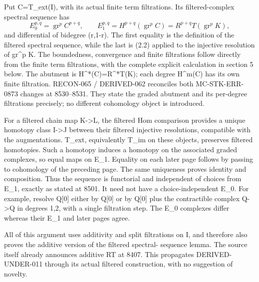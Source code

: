 \documentclass[11pt]{article}
\begin{document}
Put C\allowbreak{}=T\_\allowbreak{}ext(I)\allowbreak{},\allowbreak{} with its actual finite term filtrations. Its filtered-complex spectral sequence has \[
 E_0^{p,q}=\operatorname{gr}^p C^{p+q},\qquad
 E_1^{p,q}=H^{p+q}(\operatorname{gr}^p C)
          =R^{p+q}T(\operatorname{gr}^p K),                  \tag{4.2}
\] and differential of bidegree (r,\allowbreak{}1-r)\allowbreak{}. The first equality is the definition of the filtered spectral sequence,\allowbreak{} while the last is (2.2)\allowbreak{} applied to the injective resolution of gr\^{}p K. The boundedness,\allowbreak{} convergence and finite filtrations follow directly from the finite term filtrations,\allowbreak{} with the complete explicit calculation in section 5 below. The abutment is H\textasciicircum{}*(C)\allowbreak{}\allowbreak{}=R\textasciicircum{}*T(K)\allowbreak{}; each degree H\textasciicircum{}m(C)\allowbreak{} has its own finite filtration. RECON-065 /\allowbreak{} DERIVED-062 reconciles both MC-STK-ERR-0873 changes at 8530–\allowbreak{}8531. They state the graded abutment and its per-degree filtrations precisely; no different cohomology object is introduced.

For a filtered chain map K\allowbreak{}->L,\allowbreak{} the filtered Hom comparison provides a unique homotopy class I\allowbreak{}->J between their filtered injective resolutions,\allowbreak{} compatible with the augmentations. T\_\allowbreak{}ext,\allowbreak{} equivalently T\_\allowbreak{}im on these objects,\allowbreak{} preserves filtered homotopies. Such a homotopy induces a homotopy on the associated graded complexes,\allowbreak{} so equal maps on E\_\allowbreak{}1. Equality on each later page follows by passing to cohomology of the preceding page. The same uniqueness proves identity and composition. Thus the sequence is functorial and independent of choices from E\_\allowbreak{}1,\allowbreak{} exactly as stated at 8501. It need not have a choice-independent E\_\allowbreak{}0. For example,\allowbreak{} resolve Q[0]\allowbreak{} either by Q[0]\allowbreak{} or by Q[0]\allowbreak{} plus the contractible complex Q\allowbreak{}->Q in degrees 1,\allowbreak{}2,\allowbreak{} with a single filtration step. The E\_\allowbreak{}0 complexes differ whereas their E\_\allowbreak{}1 and later pages agree.

All of this argument uses additivity and split filtrations on I,\allowbreak{} and therefore also proves the additive version of the filtered spectral- sequence lemma. The source itself already announces additive RT at 8407. This propagates DERIVED-UNDER-011 through its actual filtered construction,\allowbreak{} with no suggestion of novelty.
\end{document}
